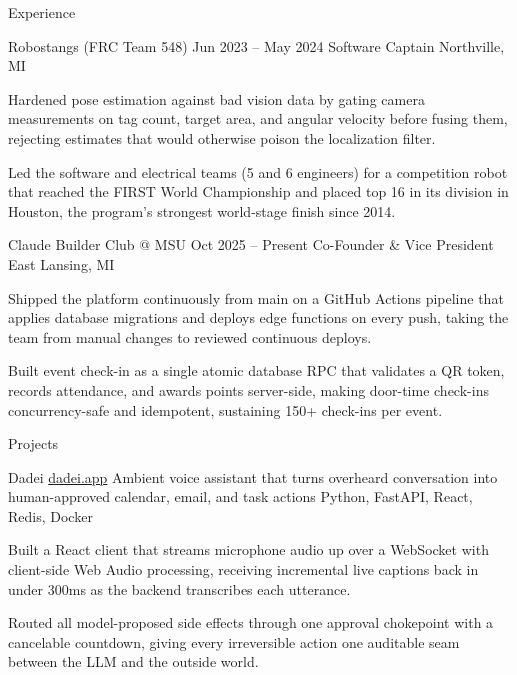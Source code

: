 \documentclass[
	11pt
]{../../../template}
\begin{document}
\begin{rSection}{E}{xperience}
		\begin{rSectionEntry}
			{Robostangs (FRC Team 548)}
			{Jun 2023 -- May 2024}
			{Software Captain}
			{}
			{Northville, MI}

			\item Hardened pose estimation against bad vision data by gating camera measurements on tag count, target area, and angular velocity before fusing them, rejecting estimates that would otherwise poison the localization filter.
			\item Led the software and electrical teams (5 and 6 engineers) for a competition robot that reached the FIRST World Championship and placed top 16 in its division in Houston, the program's strongest world-stage finish since 2014.
		\end{rSectionEntry}

		\begin{rSectionEntry}
			{Claude Builder Club @ MSU}
			{Oct 2025 -- Present}
			{Co-Founder \& Vice President}
			{}
			{East Lansing, MI}

			\item Shipped the platform continuously from main on a GitHub Actions pipeline that applies database migrations and deploys edge functions on every push, taking the team from manual changes to reviewed continuous deploys.
			\item Built event check-in as a single atomic database RPC that validates a QR token, records attendance, and awards points server-side, making door-time check-ins concurrency-safe and idempotent, sustaining 150+ check-ins per event.
		\end{rSectionEntry}
	\end{rSection}

	\begin{rSection}{P}{rojects}
		\begin{rSectionEntry}
			{Dadei}
			{\href{https://dadei.app}{dadei.app}}
			{Ambient voice assistant that turns overheard conversation into human-approved calendar, email, and task actions}
			{Python, FastAPI, React, Redis, Docker}
			{}

			\item Built a React client that streams microphone audio up over a WebSocket with client-side Web Audio processing, receiving incremental live captions back in under 300ms as the backend transcribes each utterance.
			\item Routed all model-proposed side effects through one approval chokepoint with a cancelable countdown, giving every irreversible action one auditable seam between the LLM and the outside world.
		\end{rSectionEntry}
	\end{rSection}
\end{document}
